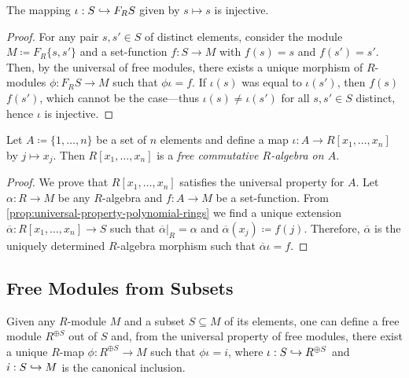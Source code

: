 \begin{corollary}
\label{cor:set-to-module-injective}
The mapping \(\iota: S \hookrightarrow F_R S\) given by \(s \mapsto s\) is injective.
\end{corollary}

\begin{proof}
For any pair \(s, s' \in S\) of distinct elements, consider the module
\(M \coloneq F_R \{s, s'\}\) and a set-function \(f: S \to M\) with \(f(s) = s\)
and \(f(s') = s'\). Then, by the universal of free modules, there exists a
unique morphism of \(R\)-modules \(\phi: F_R S \to M\) such that \(\phi \iota =
f\). If \(\iota(s)\) was equal to \(\iota(s')\), then \(f(s)\) \(f(s')\), which
cannot be the case---thus \(\iota(s) \neq \iota(s')\) for all \(s, s' \in S\)
distinct, hence \(\iota\) is injective.
\end{proof}

\begin{proposition}
\label{prop:ring-poly-is-free-commutative-R-algebra}
Let \(A \coloneq \{1, \dots, n\}\) be a set of \(n\) elements and define a map
\(\iota: A \to R[x_1, \dots, x_n]\) by \(j \mapsto x_j\). Then \(R[x_1, \dots,
x_n]\) is a \emph{free commutative \(R\)-algebra on \(A\)}.
\end{proposition}

\begin{proof}
We prove that \(R[x_1, \dots, x_n]\) satisfies the universal property for
\(A\). Let \(\alpha: R \to M\) be any \(R\)-algebra and \(f: A \to M\) be a
set-function. From \cref{prop:universal-property-polynomial-rings} we find a
unique extension \(\overline{\alpha}: R[x_1, \dots, x_n] \to S\) such that
\(\overline{\alpha}|_R = \alpha\) and \(\overline{\alpha}(x_j) \coloneq
f(j)\). Therefore, \(\overline{\alpha}\) is the uniquely determined
\(R\)-algebra morphism such that \(\overline{\alpha} \iota = f\).
\end{proof}

\subsection{Free Modules from Subsets}

Given any \(R\)-module \(M\) and a subset \(S \subseteq M\) of its elements, one
can define a free module \(R^{\oplus S}\) out of \(S\) and, from the universal
property of free modules, there exist a unique \(R\)-map \(\phi: R^{\oplus S}
\to M\) such that \(\phi \iota = i\), where \(\iota: S \hookrightarrow R^{\oplus S}\) and
\(i: S \hookrightarrow M\) is the canonical inclusion.

